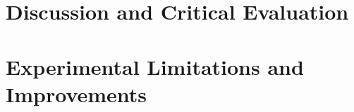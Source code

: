 \section{Discussion and Critical Evaluation}
\label{sec:discussion}


\section{Experimental Limitations and Improvements}
\label{sec:limitations}

